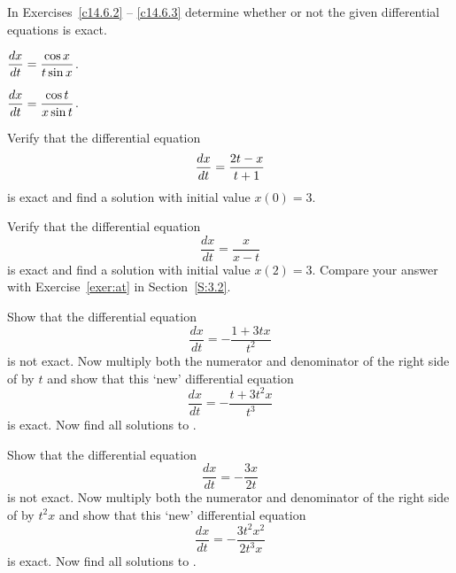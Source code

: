 \documentclass{ximera}
\begin{document}
\EXER

\TEXER

\noindent In Exercises~\ref{c14.6.2} -- \ref{c14.6.3} determine whether or 
not the given differential equations is exact.
\begin{exercise} \label{c14.6.2}
$\displaystyle \frac{dx}{dt} = \frac{\cos x}{t\sin x}$.
\end{exercise}
\begin{exercise} \label{c14.6.3}
$\displaystyle \frac{dx}{dt} = \frac{\cos t}{x\sin t}$.
\end{exercise}

\begin{exercise} \label{c14.6.4}
Verify that the differential equation 
\[
\displaystyle\frac{dx}{dt} = \displaystyle \frac{2t-x}{t+1} 
\]
is exact and find a solution with initial value $x(0) = 3$.
\end{exercise}

\begin{exercise} \label{c14.6.6}
Verify that the differential equation 
\[
\frac{dx}{dt} = \frac{x}{x-t}
\]
is exact and find a solution with initial value $x(2)=3$.   Compare your 
answer with Exercise~\ref{exer:at} in Section~\ref{S:3.2}.
\end{exercise} 

\begin{exercise}  \label{ex:if}
Show that the differential equation
\begin{equation} \label{Ex:nexact}
\frac{dx}{dt} = -\frac{1+3tx}{t^2}
\end{equation}
is not exact.  Now multiply both the numerator and denominator of the 
right side of  by $t$ and show that this `new' differential
equation 
\[
\frac{dx}{dt} = -\frac{t+3t^2x}{t^3}
\]
is exact. Now find all solutions to .
\end{exercise}

\begin{exercise}  \label{ex:if2}
Show that the differential equation
\begin{equation} \label{Ex:nexact2}
\frac{dx}{dt} = -\frac{3x}{2t}
\end{equation}
is not exact.  Now multiply both the numerator and denominator of the 
right side of  by $t^2x$ and show that this `new' differential
equation 
\[
\frac{dx}{dt} = -\frac{3t^2x^2}{2t^3x}
\]
is exact.  Now find all solutions to .
\end{exercise}
\end{document}
